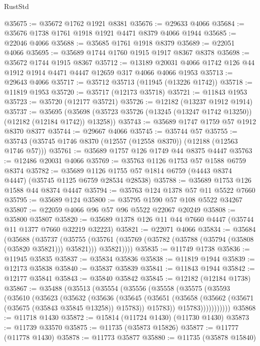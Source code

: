 \begin{lexlean}{RustStd}
\begin{coremodule}
@35675 := @35672 @1762 @1921 @8381
@35676 := @29633 @4066
@35684 := @35676 @1738 @1761 @1918 @1921 @4471 @8379 @4066 @1944
@35685 := @22046 @4066
@35688 := @35685 @1761 @1918 @8379
@35689 := @22051 @4066
@35695 := @35689 @1744 @1760 @1915 @1917 @8367 @8378
@35698 := @35672 @1744 @1915 @8367
@35712 := @13189 @20031 @4066 @1742 @126 @44 @1912 @1914 @4471 @4447 @12659 @317 @4066 @4066 @1953
@35713 := @29643 @4066
@35717 := @35712 @35713 (@11945 (@13226 @1742))
@35718 := @11819 @1953
@35720 := @35717 (@12173 @35718)
@35721 := @11843 @1953
@35723 := @35720 (@12177 @35721)
@35726 := @12182 (@13237 @1912 @1914)
@35737 := @35695
    (@35698 (@35723 @35726 (@13245 (@13247 @1742 @13250)) (@12182 (@12184 @1742)) @13258))
@35743 := @35689 @1747 @1759 @57 @1912 @8370 @8377
@35744 := @29667 @4066
@35745 := @35744 @57
@35755 := @35743 (@35745 @1746 @8370 (@12557 (@12558 @8370)) (@12188 (@12563 @1746 @57)))
@35761 := @35689 @1757 @126 @1749 @44 @8375 @4447
@35763 := @12486 @20031 @4066
@35769 := @35763 @1126 @1753 @57 @1588 @6759 @8374
@35782 := @35689 @1126 @1755 @57 @1814 @6759 (@4443 @8374 @4447) (@35745 @1125 @6759 @28534 @28538)
@35788 := @35689 @1753 @126 @1588 @44 @8374 @4447
@35794 := @35763 @124 @1378 @57 @11 @5522 @7660
@35795 := @35689 @124
@35800 := @35795 @1590 @57 @108 @5522 @34267
@35807 := @22059 @4066 @96 @57 @96 @5522 @22067 @20249
@35808 := @35800 @35807
@35820 := @35689 @1378 @126 @11 @44 @7660 @4447 (@35744 @11 @1377 @7660 @32219 @32223)
@35821 := @22071 @4066
@35834 := @35684
    (@35688
      (@35737
        (@35755
          (@35761 (@35769 (@35782 (@35788 (@35794 (@35808 (@35820 @35821))) @35821))) @35821))))
@35835 := @11749 @1738
@35836 := @11945 @35835
@35837 := @35834 @35836
@35838 := @11819 @1944
@35839 := @12173 @35838
@35840 := @35837 @35839
@35841 := @11843 @1944
@35842 := @12177 @35841
@35843 := @35840 @35842
@35845 := @12182 (@12184 @1738)
@35867 := @35488
    (@35513
      (@35554
        (@35556
          (@35558
            (@35575
              (@35593
                (@35610
                  (@35623
                    (@35632
                      (@35636
                        (@35645
                          (@35651
                            (@35658
                              (@35662 (@35671 (@35675 (@35843 @35845 @13258)) @15783))
                              @15783))
                          @15783)))))))))))
@35868 := @11718 @1430
@35872 := @15814 (@11724 @1430) (@11730 @1430)
@35873 := @11739 @33570
@35875 := @11735 (@35873 @15826)
@35877 := @11777 (@11778 @1430)
@35878 := @11773 @35877
@35880 := @11735 (@35878 @15840)

\end{coremodule}
\end{lexlean}
